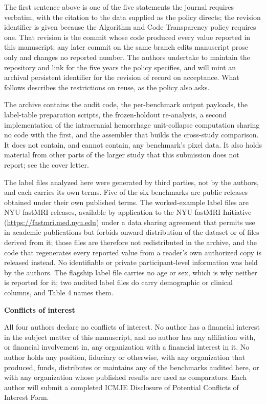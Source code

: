 \documentclass[11pt,letterpaper]{article}
\newcommand{\block}[1]{\vspace{0.5em}\textbf{#1}\par}
\begin{document}
\vspace{0.3em}
{\small The first sentence above is one of the five statements the journal
requires verbatim, with the citation to the data supplied as the policy directs;
the revision identifier is given because the Algorithm and Code Transparency
policy requires one. That revision is the commit whose code produced every value
reported in this manuscript; any later commit on the same branch edits manuscript
prose only and changes no reported number. The authors undertake to maintain the
repository and link for the five years the policy specifies, and will mint an
archival persistent identifier for the revision of record on acceptance. What follows describes the
restrictions on reuse, as the policy also asks.

The archive contains the audit code, the per-benchmark output payloads, the
label-table preparation scripts, the frozen-holdout re-analysis, a second
implementation of the intracranial hemorrhage unit-collapse computation sharing
no code with the first, and the assembler that builds the cross-study
comparison. It does not contain, and cannot contain,
any benchmark's pixel data. It also holds material from other parts of the
larger study that this submission does not report; see the cover letter.

The label files analyzed here were generated by third parties, not by the
authors, and each carries its own terms. Five of the six benchmarks are
public releases obtained under their own published terms. The worked-example
label files are NYU fastMRI releases, available by application to the NYU
fastMRI Initiative (\url{https://fastmri.med.nyu.edu}) under a data sharing
agreement that permits use in academic publications but forbids onward
distribution of the dataset or of files derived from it; those files are
therefore not redistributed in the archive, and the code that regenerates
every reported value from a reader's own authorized copy is released instead.
No identifiable or private participant-level information was held by the
authors. The flagship label file carries no age or sex, which is why neither is
reported for it; two audited label files do carry demographic or clinical
columns, and Table 4 names them.}

\block{Conflicts of interest}

All four authors declare no conflicts of interest. No author has a financial
interest in the subject matter of this manuscript, and no author has any
affiliation with, or financial involvement in, any organization with a
financial interest in it. No author holds any position, fiduciary or
otherwise, with any organization that produced, funds, distributes or
maintains any of the benchmarks audited here, or with any organization whose
published results are used as comparators. Each author will submit a completed
ICMJE Disclosure of Potential Conflicts of Interest Form.
\end{document}
